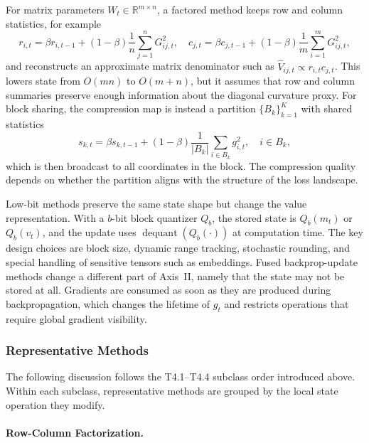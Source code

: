 For matrix parameters $W_t\in\mathbb{R}^{m\times n}$, a factored method keeps
row and column statistics, for example
\begin{equation}
  r_{i,t}=\beta r_{i,t-1}+(1-\beta)\frac{1}{n}\sum_{j=1}^{n}G_{ij,t}^2,
  \quad
  c_{j,t}=\beta c_{j,t-1}+(1-\beta)\frac{1}{m}\sum_{i=1}^{m}G_{ij,t}^2,
  \label{eq:t4-row-column-states}
\end{equation}
and reconstructs an approximate matrix denominator such as
$\widehat{V}_{ij,t}\propto r_{i,t}c_{j,t}$.  This lowers state from
$O(mn)$ to $O(m+n)$, but it assumes that row and column summaries preserve
enough information about the diagonal curvature proxy.  For block sharing,
the compression map is instead a partition
$\{B_k\}_{k=1}^{K}$ with shared statistics
\begin{equation}
  s_{k,t} = \beta s_{k,t-1}
  +(1-\beta)\frac{1}{|B_k|}\sum_{i\in B_k}g_{i,t}^2,
  \quad i\in B_k,
  \label{eq:t4-block-sharing}
\end{equation}
which is then broadcast to all coordinates in the block.  The compression
quality depends on whether the partition aligns with the structure of the
loss landscape.

Low-bit methods preserve the same state shape but change the value
representation.  With a $b$-bit block quantizer $Q_b$, the stored state is
$Q_b(m_t)$ or $Q_b(v_t)$, and the update
uses $\operatorname{dequant}(Q_b(\cdot))$ at computation time.  The key design
choices are block size, dynamic range tracking, stochastic rounding, and
special handling of sensitive tensors such as embeddings.  Fused
backprop-update methods change a different part of Axis~II, namely that the state may not
be stored at all.  Gradients are consumed as soon as they are produced during
backpropagation, which changes the lifetime of $g_t$ and restricts operations
that require global gradient visibility.

\subsubsection{Representative Methods}
\label{sec:t4-methods}

\noindent
The following discussion follows the T4.1--T4.4 subclass order introduced
above.  Within each subclass, representative methods are grouped by the local
state operation they modify.

\paragraph{Row-Column Factorization.}
\label{sec:t4-factorized}


